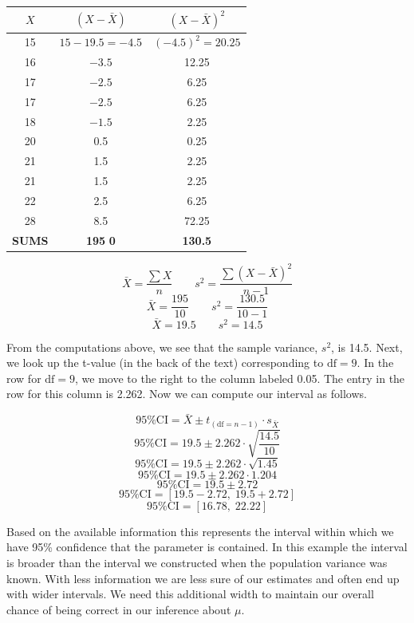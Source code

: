 \documentclass[12pt]{article}
\begin{document}
\newpage


\begin{center}
\begin{tabular}{c c c}
\hline
$X$ & $(X - \bar{X})$ & $(X - \bar{X})^2$ \\
\hline
15 & $15 - 19.5 = -4.5$ & $(-4.5)^2 = 20.25$ \\
16 & $-3.5$ & 12.25 \\
17 & $-2.5$ & 6.25 \\
17 & $-2.5$ & 6.25 \\
18 & $-1.5$ & 2.25 \\
20 & 0.5 & 0.25 \\
21 & 1.5 & 2.25 \\
21 & 1.5 & 2.25 \\
22 & 2.5 & 6.25 \\
28 & 8.5 & 72.25 \\
\hline
\textbf{SUMS} & \textbf{195} \quad \textbf{0} & \textbf{130.5} \\
\hline
\end{tabular}
\end{center}

\[
\bar{X} = \frac{\sum X}{n} \qquad s^2 = \frac{\sum (X - \bar{X})^2}{n - 1}
\]
\[
\bar{X} = \frac{195}{10} \qquad s^2 = \frac{130.5}{10 - 1}
\]
\[
\bar{X} = 19.5 \qquad s^2 = 14.5
\]

From the computations above, we see that the sample variance, $s^2$, is 14.5. Next, we look up
the t-value (in the back of the text) corresponding to $\text{df}=9$. In the row for $\text{df}=9$, we move to
the right to the column labeled 0.05. The entry in the row for this column is 2.262. Now we
can compute our interval as follows.

\[
95\%\text{CI} = \bar{X} \pm t_{(\text{df}=n-1)} \cdot s_{\bar{X}}
\]
\[
95\%\text{CI} = 19.5 \pm 2.262 \cdot \sqrt{\frac{14.5}{10}}
\]
\[
95\%\text{CI} = 19.5 \pm 2.262 \cdot \sqrt{1.45}
\]
\[
95\%\text{CI} = 19.5 \pm 2.262 \cdot 1.204
\]
\[
95\%\text{CI} = 19.5 \pm 2.72
\]
\[
95\%\text{CI} = [19.5 - 2.72, \; 19.5 + 2.72]
\]
\[
95\%\text{CI} = [16.78, \; 22.22]
\]

Based on the available information this represents the interval within which we
have 95\% confidence that the parameter is contained. In this example the interval is
broader than the interval we constructed when the population variance was known. With
less information we are less sure of our estimates and often end up with wider intervals.
We need this additional width to maintain our overall chance of being correct in our
inference about $\mu$.
\end{document}
